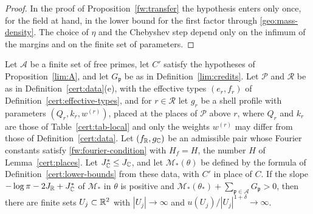\begin{proof}
In the proof of Proposition~\ref{fw:transfer} the hypothesis enters only once,
for the field at hand, in the lower bound for the first factor through
\eqref{geo:mass-density}. The choice of $\eta$ and the Chebyshev step depend
only on the infimum of the margins and on the finite set of parameters.
\end{proof}

\begin{proposition}\label{lim:B}
Let $\mathcal A$ be a finite set of free primes, let $C'$ satisfy the
hypotheses of Proposition~\ref{lim:A}, and let $G_{\mathfrak p}$ be as in
Definition~\ref{lim:credits}. Let $\mathcal P$ and $\mathcal R$ be as
in Definition~\ref{cert:data}(e), with the effective types $(e_r,f_r)$ of
Definition~\ref{cert:effective-types}, and for $r\in\mathcal R$ let $g_r$ be a
shell profile with parameters $(Q_r,k_r,w^{(r)})$, placed at the places of
$\mathcal P$ above $r$, where $Q_r$ and $k_r$ are those of
Table~\ref{cert:tab-local} and only the weights $w^{(r)}$ may differ from those
of Definition~\ref{cert:data}. Let $(f_\mathbb R,g_\mathbb C)$ be an admissible pair whose Fourier
constants satisfy \eqref{fw:fourier-condition} with $H_f=H$, the number $H$ of
Lemma~\ref{cert:places}. Let $J_\mathbb C^*\le J_\mathbb C$, and let $\mathcal M_*(\theta)$
be defined by the formula of Definition~\ref{cert:lower-bounds} from these
data, with $C'$ in place of $C$. If the slope $-\log\pi-2J_\mathbb R+J_\mathbb C^*$ of
$\mathcal M_*$ in $\theta$ is positive and
$\mathcal M_*(\theta_*)+\sum_{\mathfrak p\in\mathcal A}G_{\mathfrak p}>0$, then
there are finite sets $U_j\subset\mathbb R^2$ with $|U_j|\to\infty$ and
$u(U_j)/|U_j|^{1+\delta}\to\infty$.
\end{proposition}

